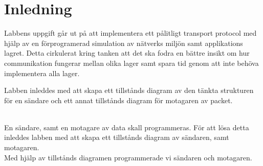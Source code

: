 \section{Inledning}

Labbens uppgift går ut på att implementera ett pålitligt transport protocol med hjälp av en
förprogramerad simulation av nätverks miljön samt applikations lagret. Detta cirkulerat kring
tanken att det ska fodra en bättre insikt om hur communikation fungerar mellan olika lager samt
spara tid genom att inte behöva implementera alla lager. 

Labben inleddes med att skapa ett tillstånds diagram av den tänkta strukturen för en sändare och
ett annat tillstånds diagram för motagaren av packet.

\\ En sändare, samt en motagare av data skall programmeras. För att lösa detta inleddes
labben med att skapa ett tillstånds diagram av sändaren, samt motagaren.
\\ Med hjälp av tillstånds diagramen programmerade vi sändaren och motagaren.

